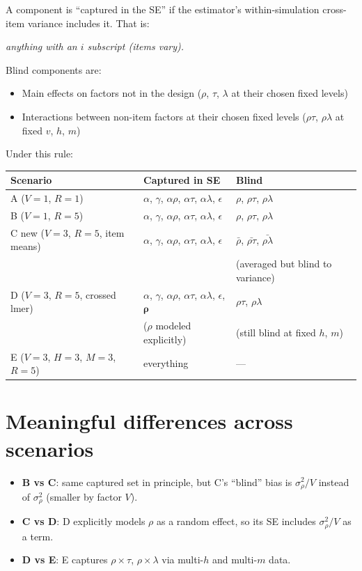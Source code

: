 \documentclass[11pt]{article}
\begin{document}
A component is ``captured in the SE'' if the estimator's within-simulation cross-item variance includes it. That is:
\begin{center}
\emph{anything with an $i$ subscript (items vary).}
\end{center}

Blind components are:
\begin{itemize}
  \item Main effects on factors not in the design ($\rho$, $\tau$, $\lambda$ at their chosen fixed levels)
  \item Interactions between non-item factors at their chosen fixed levels ($\rho\tau$, $\rho\lambda$ at fixed $v$, $h$, $m$)
\end{itemize}

Under this rule:

\begin{center}
\begin{tabular}{lll}
\toprule
Scenario & Captured in SE & Blind \\
\midrule
A ($V=1$, $R=1$) & $\alpha$, $\gamma$, $\alpha\rho$, $\alpha\tau$, $\alpha\lambda$, $\epsilon$ & $\rho$, $\rho\tau$, $\rho\lambda$ \\
B ($V=1$, $R=5$) & $\alpha$, $\gamma$, $\alpha\rho$, $\alpha\tau$, $\alpha\lambda$, $\epsilon$ & $\rho$, $\rho\tau$, $\rho\lambda$ \\
C new ($V=3$, $R=5$, item means) & $\alpha$, $\gamma$, $\alpha\rho$, $\alpha\tau$, $\alpha\lambda$, $\epsilon$ & $\bar\rho$, $\bar{\rho\tau}$, $\bar{\rho\lambda}$\\
  & & \footnotesize(averaged but blind to variance)\\
D ($V=3$, $R=5$, crossed lmer) & $\alpha$, $\gamma$, $\alpha\rho$, $\alpha\tau$, $\alpha\lambda$, $\epsilon$, $\boldsymbol{\rho}$ & $\rho\tau$, $\rho\lambda$\\
  & \footnotesize($\rho$ modeled explicitly) & \footnotesize(still blind at fixed $h$, $m$)\\
E ($V=3$, $H=3$, $M=3$, $R=5$) & everything & --- \\
\bottomrule
\end{tabular}
\end{center}

\section*{Meaningful differences across scenarios}

\begin{itemize}
  \item \textbf{B vs C}: same captured set in principle, but C's ``blind'' bias is $\sigma^2_\rho/V$ instead of $\sigma^2_\rho$ (smaller by factor $V$).
  \item \textbf{C vs D}: D explicitly models $\rho$ as a random effect, so its SE includes $\sigma^2_\rho/V$ as a term.
  \item \textbf{D vs E}: E captures $\rho\times\tau$, $\rho\times\lambda$ via multi-$h$ and multi-$m$ data.
\end{itemize}
\end{document}
